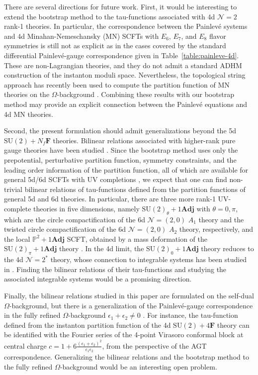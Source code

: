 \documentclass[11pt, a4paper]{article}
\theoremstyle{definition}
\begin{document}
There are several directions for future work. First, it would be interesting to extend the bootstrap method to the tau-functions associated with 4d $ \mathcal{N}=2 $ rank-1 theories. In particular, the correspondence between the Painlev\'e systems and 4d Minahan-Nemeschansky (MN) SCFTs with $ E_6 $, $ E_7 $, and $ E_8 $ flavor symmetries is still not as explicit as in the cases covered by the standard differential Painlev\'e-gauge correspondence given in Table~\ref{table:painleve-4d}. These are non-Lagrangian theories, and they do not admit a standard ADHM construction of the instanton moduli space. Nevertheless, the topological string approach has recently been used to compute the partition function of MN theories on the $ \Omega $-background \cite{Fucito:2023txg}. Combining these results with our bootstrap method may provide an explicit connection between the Painlev\'e equations and 4d MN theories.

Second, the present formulation should admit generalizations beyond the 5d $ \mathrm{SU}(2)+N_f\mathbf{F} $ theories. Bilinear relations associated with higher-rank pure gauge theories have been studied \cite{Bonelli:2022iob, Bershtein:2017swf,Bershtein:2018srt}. Since the bootstrap method uses only the prepotential, perturbative partition function, symmetry constraints, and the leading order information of the partition function, all of which are available for general 5d/6d SCFTs with UV completions \cite{Kim:2020hhh}, we expect that one can find non-trivial bilinear relations of tau-functions defined from the partition functions of general 5d and 6d theories. In particular, there are three more rank-1 UV-complete theories in five dimensions, namely $ \mathrm{SU}(2)_\theta + 1\mathbf{Adj} $ with $ \theta=0,\pi $, which are the circle compactification of the 6d $ \mathcal{N}=(2,0) $ $ A_1 $ theory and the twisted circle compactification of the 6d $ \mathcal{N}=(2,0) $ $ A_2 $ theory, respectively, and the local $ \mathbb{P}^2 + 1\mathbf{Adj} $ SCFT, obtained by a mass deformation of the $ \mathrm{SU}(2)_\pi + 1\mathbf{Adj} $ theory \cite{Bhardwaj:2019jtr, Kim:2020hhh}. In the 4d limit, the $ \mathrm{SU}(2)_0 + 1\mathbf{Adj} $ theory reduces to the 4d $ \mathcal{N}=2^* $ theory, whose connection to integrable systems has been studied in \cite{Bonelli:2019boe}. Finding the bilinear relations of their tau-functions and studying the associated integrable systems would be a promising direction.

Finally, the bilinear relations studied in this paper are formulated on the self-dual $ \Omega $-background, but there is a generalization of the Painlev\'e-gauge correspondence in the fully refined $ \Omega $-background $ \epsilon_1+\epsilon_2 \neq 0 $ \cite{Bonelli:2025rih, Bonelli:2025mfw}. For instance, the tau-function defined from the instanton partition function of the 4d $ \mathrm{SU}(2)+4\mathbf{F} $ theory can be identified with the Fourier series of the 4-point Virasoro conformal block at central charge $ c = 1+6\frac{(\epsilon_1+\epsilon_2)^2}{\epsilon_1\epsilon_2} $, from the perspective of the AGT correspondence. Generalizing the bilinear relations and the bootstrap method to the fully refined $ \Omega $-background would be an interesting open problem.
\end{document}
